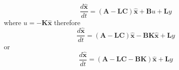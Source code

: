 \[
\frac{d\hat{\mathbf{x}}}{dt}=(\mathbf{A}-\mathbf{LC})\hat{\mathbf{x}}+ \mathbf{B}u+\mathbf{L}y
\]
where $u=-\mathbf{K}\hat{\mathbf{x}}$ therefore
\[
\frac{d\hat{\mathbf{x}}}{dt}=(\mathbf{A}-\mathbf{LC})\hat{\mathbf{x}} - \mathbf{BK}\hat{\mathbf{x}}+\mathbf{L}y
\]
or
\[
\frac{d\hat{\mathbf{x}}}{dt}=(\mathbf{A} - \mathbf{LC} - \mathbf{BK})\hat{\mathbf{x}} + \mathbf{L}y
\]


\endinput

